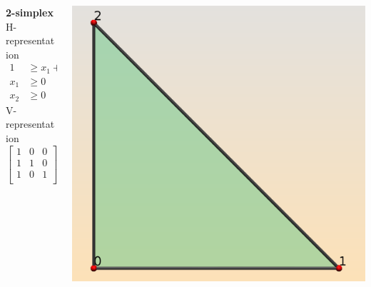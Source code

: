 \begin{frame}
\begin{columns}[t]
\begin{column}{0.5\textwidth}
\begin{block}{\textbf{2-simplex}}
H-representation
\begin{equation}
\begin{aligned}\label{eq:simplex2H}
1 &\geq x_1 + x_2\\ 
x_1 &\geq 0\\
x_2 &\geq 0
\end{aligned}
\end{equation}
V-representation
$$
\begin{bmatrix}
  1 & 0 & 0\\
  1 & 1 & 0\\
  1 & 0 & 1\\
\end{bmatrix}
$$
\end{block}
\end{column}
\begin{column}{0.5\textwidth}
\begin{center}
\includegraphics[width=1.0\textwidth]{fig/simplex2.png}
\end{center}
\end{column}
\end{columns}
\end{frame}
